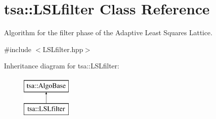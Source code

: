 \hypertarget{classtsa_1_1_l_s_lfilter}{}\section{tsa\+:\+:L\+S\+Lfilter Class Reference}
\label{classtsa_1_1_l_s_lfilter}


Algorithm for the filter phase of the Adaptive Least Squares Lattice.  




{\ttfamily \#include $<$L\+S\+Lfilter.\+hpp$>$}

Inheritance diagram for tsa\+:\+:L\+S\+Lfilter\+:\begin{figure}[H]
\begin{center}
\leavevmode
\includegraphics[height=2.000000cm]{classtsa_1_1_l_s_lfilter}
\end{center}
\end{figure}
